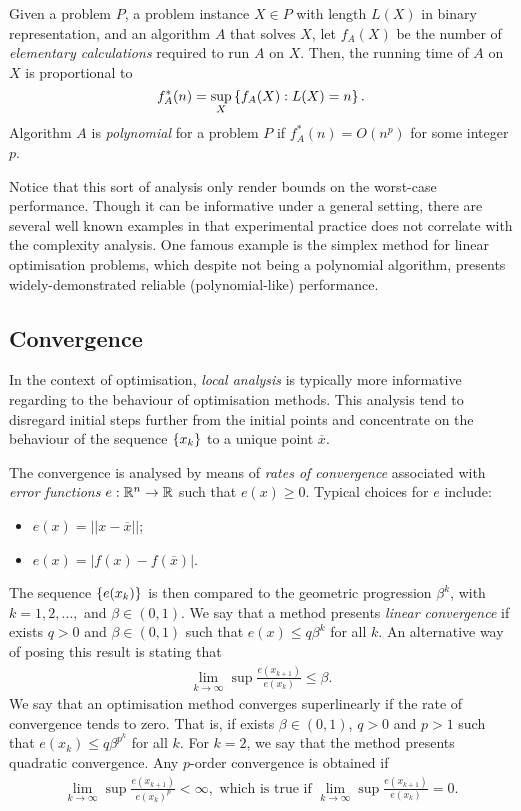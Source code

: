 \begin{definition}
    Given a problem $P$, a problem instance $X \in P$ with length $L(X)$ in binary representation, and an algorithm $A$ that solves $X$, let $f_A(X)$ be the number of \emph{elementary calculations} required to run $A$ on $X$. Then, the running time of $A$ on $X$ is proportional to $$f^*_A(n) = \sup_X\left\{ f_A(X) : L(X) = n \right \}.$$ Algorithm $A$ is \emph{polynomial} for a problem $P$ if $f^*_A(n) = O(n^p)$ for some integer $p$.
\end{definition}

Notice that this sort of analysis only render bounds on the worst-case performance. Though it can be informative under a general setting, there are several well known examples in that experimental practice does not correlate with the complexity analysis. One famous example is the simplex method for linear optimisation problems, which despite not being a polynomial algorithm, presents widely-demonstrated reliable (polynomial-like) performance. 

\subsection{Convergence}

In the context of optimisation, \emph{local analysis} is typically more informative regarding to the behaviour of optimisation methods. This analysis tend to disregard initial steps further from the initial points and concentrate on the behaviour of the sequence $\left\{ x_k \right \}$ to a unique point $\overline{x}$.

The convergence is analysed by means of \emph{rates of convergence} associated with \emph{error functions} $e: \mathbb{R}^n \to \mathbb{R}$ such that $e(x) \geq 0$. Typical choices for $e$ include:
\begin{itemize}
\item $e(x) = ||x - \overline{x}||$;
\item $e(x) = |f(x) - f(\overline{x})|$.
\end{itemize}

The sequence $\left\{ e(x_k) \right \}$ is then compared to the geometric progression $\beta^k$, with $k=1,2,\dots,$ and $\beta \in (0,1)$. We say that a method presents \emph{linear convergence} if exists $q > 0$ and $\beta \in (0,1)$ such that $e(x) \leq q\beta^k$ for all $k$. An alternative way of posing this result is stating that
%
\begin{align*}
	\lim_{k\rightarrow\infty} \sup \frac{e(x_{k+1})}{e(x_k)} \leq \beta.
\end{align*}
%
We say that an optimisation method converges superlinearly if the rate of convergence tends to zero. That is, if exists $\beta \in (0,1)$, $q > 0$ and $p > 1$ such that $e(x_k) \leq q\beta^{p^k}$ for all $k$. For $k=2$, we say that the method presents quadratic convergence. Any $p$-order convergence is obtained if 
%
\begin{align*}
	\lim_{k\rightarrow\infty} \sup \frac{e(x_{k+1})}{e(x_k)^p} < \infty, \text{ which is true if }
\lim_{k\rightarrow\infty} \sup \frac{e(x_{k+1})}{e(x_k)} = 0	.
\end{align*}

